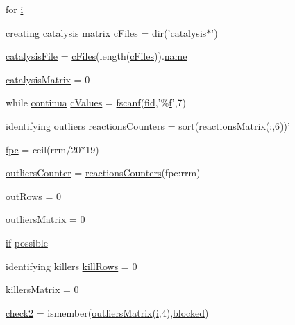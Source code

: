 \begin{DoxyCompactItemize}
for \hyperlink{a00030_ae938073aeda31fad21f2546017d92d4d}{i}
\item 
creating \hyperlink{a00011}{catalysis} matrix \hyperlink{a00030_a9eab57ccb42a39c704f47dc30e4f4515}{c\+Files} = \hyperlink{a00113_a4ca269cf93df1b512b52174c1a256fe5}{dir}('\hyperlink{a00011}{catalysis}$\ast$')
\item 
\hyperlink{a00030_a33e70cf5b45cb59005b82d30202f0b69}{catalysis\+File} = \hyperlink{a00030_a9eab57ccb42a39c704f47dc30e4f4515}{c\+Files}(length(\hyperlink{a00030_a9eab57ccb42a39c704f47dc30e4f4515}{c\+Files})).\hyperlink{a00027_abbf559a76fab59203496b0847ab9502a}{name}
\item 
\hyperlink{a00030_a0810027f58d6be965e44b7b84c44ace8}{catalysis\+Matrix} = 0
\item 
while \hyperlink{a00030_a9c951ebd5bc3f1adce943bee1255f4d6}{continua} \hyperlink{a00030_ad4ba7701967c1da20171228afccb7081}{c\+Values} = \hyperlink{a00025_a028ac102a731e62fb0a7439381f566c1}{fscanf}(\hyperlink{a00031_ae9011d40c6f13e68e6f07156e0da7c5d}{fid},'\%\hyperlink{a00025_a9c5a71c46b1abb8b7df5ebeac6c81535}{f}',7)
\item 
identifying outliers \hyperlink{a00030_aeea253cb98a56047ef20ceed86e2f0ea}{reactions\+Counters} = sort(\hyperlink{a00030_af998036b749d9fa6dd2365f9937279b6}{reactions\+Matrix}(\+:,6))'
\item 
\hyperlink{a00030_ab4459bcd3f7a26410560d9bd951f12bd}{fpc} = ceil(rrm/20$\ast$19)
\item 
\hyperlink{a00030_a7ec5b1f1e07b66a5d6fc972cb8b03c1f}{outliers\+Counter} = \hyperlink{a00030_aeea253cb98a56047ef20ceed86e2f0ea}{reactions\+Counters}(fpc\+:rrm)
\item 
\hyperlink{a00030_a60cfb1ca20cbbc81b85a8f56658b7c99}{out\+Rows} = 0
\item 
\hyperlink{a00030_ad8a18b407726bf44299c9bcf5d1389ff}{outliers\+Matrix} = 0
\item 
\hyperlink{a00030_a01d55766b8058903dd360b4bda71f9f5}{if} \hyperlink{a00030_a07c9e68cdbafe572c04d3112d64deb88}{possible}
\item 
identifying killers \hyperlink{a00030_a0e22d9868b850c50dfc13f5d28db8c30}{kill\+Rows} = 0
\item 
\hyperlink{a00030_a929016802e1ede2217a41240a6974fa6}{killers\+Matrix} = 0
\item 
\hyperlink{a00030_a98a8838a85ed24032563a44271b1525a}{check2} = ismember(\hyperlink{a00030_a9733b61dd859b1133aa3aa849cf70cbc}{outliers\+Matrix}(\hyperlink{a00113_ad3efca1ea6e3333daf30719ee0501862}{i},4),\hyperlink{a00030_a1faaaae288fc8ca4ed1751049aa2f84f}{blocked})

\end{DoxyCompactItemize}

